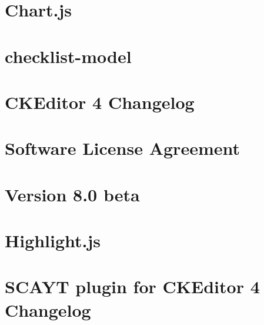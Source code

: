 \documentclass[twoside]{book}
\newcommand{\+}{\discretionary{\mbox{\scriptsize$\hookleftarrow$}}{}{}}
\begin{document}
\chapter{Chart.\+js}
\label{md_app_web_bower_components_chartjs__r_e_a_d_m_e}

\chapter{checklist-\/model}
\label{md_app_web_bower_components_checklist-model_readme}

\chapter{C\+K\+Editor 4 Changelog}
\label{md_app_web_bower_components_ckeditor__c_h_a_n_g_e_s}

\chapter{Software License Agreement}
\label{md_app_web_bower_components_ckeditor__l_i_c_e_n_s_e}

\chapter{Version 8.0 beta}
\label{md_app_web_bower_components_ckeditor_plugins_codesnippet_lib_highlight__c_h_a_n_g_e_s}

\chapter{Highlight.\+js}
\label{md_app_web_bower_components_ckeditor_plugins_codesnippet_lib_highlight__r_e_a_d_m_e_8ru}

\chapter{S\+C\+A\+YT plugin for C\+K\+Editor 4 Changelog}
\label{md_app_web_bower_components_ckeditor_plugins_scayt__c_h_a_n_g_e_l_o_g}

\end{document}
